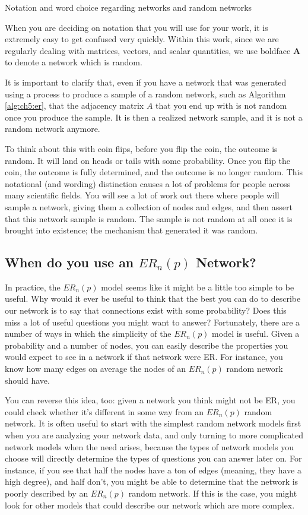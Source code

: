 \begin{floatingbox}[h]\caption{Notation and word choice regarding networks and random networks}
When you are deciding on notation that you will use for your work, it is {extremely} easy to get confused very quickly. Within this work, since we are regularly dealing with matrices, vectors, and scalar quantities, we use boldface $\mathbf A$ to denote a network which is random. 

It is important to clarify that, even if you have a network that was {generated} using a process to produce a sample of a random network, such as Algorithm \ref{alg:ch5:er}, that the adjacency matrix $A$ that you end up with is not random once you produce the sample. It is then a {realized} network sample, and it is {not} a random network anymore. 

To think about this with coin flips, before you flip the coin, the outcome is random. It will land on heads or tails with some probability. Once you flip the coin, the outcome is fully determined, and the outcome is no longer random. This notational (and wording) distinction causes a {lot} of problems for people across many scientific fields. You will see a lot of work out there where people will sample a network, giving them a collection of nodes and edges, and then assert that this network sample is random. The sample is not random at all once it is brought into existence; the mechanism that generated it was random. 
\end{floatingbox}

\subsection{When do you use an $ER_n(p)$ Network?}

In practice, the $ER_n(p)$ model seems like it might be a little too simple to be useful. Why would it ever be useful to think that the best you can do to describe our network is to say that connections exist with some probability? Does this miss a {lot} of useful questions you might want to answer? Fortunately, there are a number of ways in which the simplicity of the $ER_n(p)$ model is useful. Given a probability and a number of nodes, you can easily describe the properties you would expect to see in a network if that network were ER. For instance, you know how many edges on average the nodes of an $ER_n(p)$ random nework should have. 

You can reverse this idea, too: given a network you think might {not} be ER, you could check whether it's different in some way from an $ER_n(p)$ random network. It is often useful to start with the {simplest} random network models first when you are analyzing your network data, and only turning to more complicated network models when the need arises, because the types of network models you choose will directly determine the types of questions you can answer later on. For instance, if you see that half the nodes have a ton of edges (meaning, they have a high degree), and half don't, you might be able to determine that the network is poorly described by an $ER_n(p)$ random network. If this is the case, you might look for other models that could describe our network which are more complex. 

